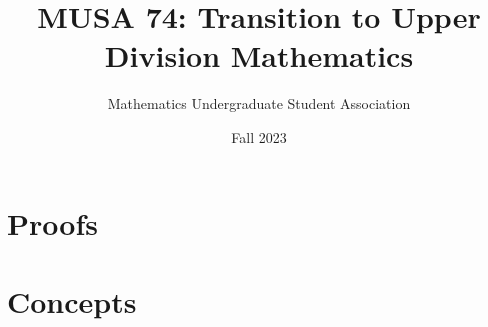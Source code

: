 \documentclass[openany]{book}
\title{MUSA 74: Transition to Upper Division Mathematics}
\author{Mathematics Undergraduate Student Association}
\date{Fall 2023}
\begin{document}
\setcounter{chapter}{-1}


\part{Proofs}





\part{Concepts}




\nirprintbib
\nirprintindex
\end{document}
